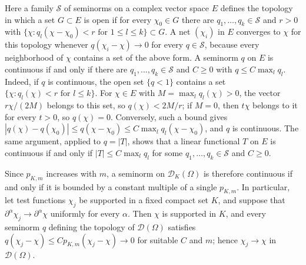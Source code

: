 Here a family $\mathcal S$ of seminorms on a complex vector space $E$ defines the topology in which a set $G\subset E$ is open if for every $\chi_0\in G$ there are $q_1,\ldots,q_k\in\mathcal S$ and $r>0$ with $\{\chi:q_l(\chi-\chi_0)<r\text{ for }1\leq l\leq k\}\subset G$. A net $(\chi_i)$ in $E$ converges to $\chi$ for this topology whenever $q(\chi_i-\chi)\to0$ for every $q\in\mathcal S$, because every neighborhood of $\chi$ contains a set of the above form. A seminorm $q$ on $E$ is continuous if and only if there are $q_1,\ldots,q_k\in\mathcal S$ and $C\geq0$ with $q\leq C\max_lq_l$. Indeed, if $q$ is continuous, the open set $\{q<1\}$ contains a set $\{\chi:q_l(\chi)<r\text{ for }l\leq k\}$. For $\chi\in E$ with $M=\max_lq_l(\chi)>0$, the vector $r\chi/(2M)$ belongs to this set, so $q(\chi)<2M/r$; if $M=0$, then $t\chi$ belongs to it for every $t>0$, so $q(\chi)=0$. Conversely, such a bound gives $|q(\chi)-q(\chi_0)|\leq q(\chi-\chi_0)\leq C\max_lq_l(\chi-\chi_0)$, and $q$ is continuous. The same argument, applied to $q=|T|$, shows that a linear functional $T$ on $E$ is continuous if and only if $|T|\leq C\max_lq_l$ for some $q_1,\ldots,q_k\in\mathcal S$ and $C\geq0$.

Since $p_{K,m}$ increases with $m$, a seminorm on $\mathcal D_K(\Omega)$ is therefore continuous if and only if it is bounded by a constant multiple of a single $p_{K,m}$. In particular, let test functions $\chi_j$ be supported in a fixed compact set $K$, and suppose that $\partial^\alpha\chi_j\to\partial^\alpha\chi$ uniformly for every $\alpha$. Then $\chi$ is supported in $K$, and every seminorm $q$ defining the topology of $\mathcal D(\Omega)$ satisfies $q(\chi_j-\chi)\leq Cp_{K,m}(\chi_j-\chi)\to0$ for suitable $C$ and $m$; hence $\chi_j\to\chi$ in $\mathcal D(\Omega)$.

